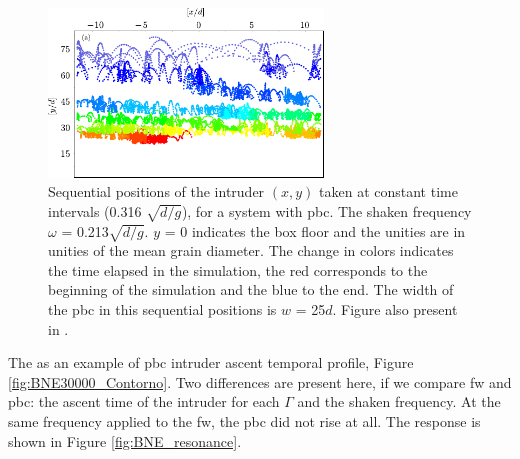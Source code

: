 \begin{figure}
    \centering
    \includegraphics[width=0.65\textwidth]{04-figuras/BNE_PositionPBC.pdf}
    \caption[BNE with periodic boundary: sample of intruder positions.]{Sequential positions of the intruder $(x, y)$ taken at constant time intervals (0.316 $\sqrt{d/g}$), for a system with pbc. The shaken frequency $\omega$ = 0.213$\sqrt{d/g}$. $y$ = 0 indicates the box floor and the unities are in unities of the mean grain diameter. The change in colors indicates the time elapsed in the simulation, the red corresponds to the beginning of the simulation and the blue to the end. The width of the pbc in this sequential positions is $w$ = 25$d$. Figure also present in \cite{Large-deviation_quantification_of_boundary_conditions_on_the_Brazil_nut_effect}.}
    \label{fig:BNE_intruderwalls}
\end{figure}


    The as an example of pbc intruder ascent temporal profile, Figure \ref{fig:BNE30000_Contorno}. Two differences are present here, if we compare fw and pbc: the ascent time of the intruder for each $\Gamma$ and the shaken frequency. At the same frequency applied to the fw, the pbc did not rise at all. The response is shown in Figure \ref{fig:BNE_resonance}.


